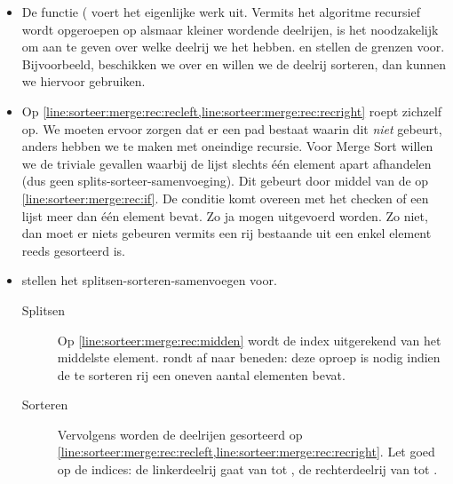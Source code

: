 \begin{itemize}
  \item De functie 
        ( voert
        het eigenlijke werk uit. Vermits het algoritme recursief wordt
        opgeroepen op alsmaar kleiner wordende deelrijen, is het noodzakelijk
        om aan te geven over welke deelrij we het hebben.
         en  stellen
        de grenzen voor. Bijvoorbeeld, beschikken we over 
        en willen we de deelrij \inlinecode{[4,3,2]} sorteren, dan kunnen we hiervoor
         gebruiken.
  \item Op \cref{line:sorteer:merge:rec:recleft,line:sorteer:merge:rec:recright}
        roept  zichzelf op. We moeten ervoor zorgen
        dat er een pad bestaat waarin dit \emph{niet} gebeurt, anders hebben we te maken met
        oneindige recursie. Voor Merge Sort willen we de
        triviale gevallen waarbij de lijst slechts \'e\'en element
        apart afhandelen (dus geen splits-sorteer-samenvoeging). Dit gebeurt
        door middel van de  op \cref{line:sorteer:merge:rec:if}.
        De conditie  komt overeen met het
        checken of een lijst meer dan \'e\'en element bevat. Zo ja
        mogen 
        uitgevoerd worden. Zo niet, dan moet er niets gebeuren vermits
        een rij bestaande uit een enkel element reeds gesorteerd is.
  \item {}
        stellen het splitsen-sorteren-samenvoegen voor.
        \begin{description}
          \item[Splitsen] Op \cref{line:sorteer:merge:rec:midden} wordt de index uitgerekend
            van het middelste element.  rondt af naar beneden:
            deze oproep is nodig indien de te sorteren rij een oneven aantal elementen bevat.
          \item[Sorteren] Vervolgens worden de deelrijen gesorteerd op
            \cref{line:sorteer:merge:rec:recleft,line:sorteer:merge:rec:recright}.
            Let goed op de indices: de linkerdeelrij gaat van 
            tot , de rechterdeelrij van  tot .

\end{description}
\end{itemize}
